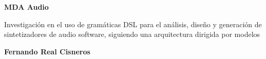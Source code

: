 \documentclass[12pt,a4paper]{report}
\begin{document}
\begin{titlepage}
    \centering
    \vspace*{4cm}
    {\Huge \bfseries MDA Audio \par}
    \vspace{1.5cm}
    {\Large Investigación en el uso de gramáticas DSL para el análisis, diseño y generación de sintetizadores de audio software, siguiendo una arquitectura dirigida por modelos \par}
    \vspace{2cm}
    {\Large \textbf{Fernando Real Cisneros} \par}
    \vfill
\end{titlepage}



\tableofcontents
\newpage









\appendix


\cleardoublepage
{}
\listoffigures
\end{document}
